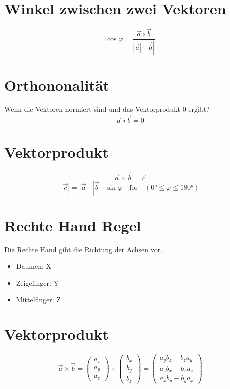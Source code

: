 \section{Winkel zwischen zwei Vektoren}
	\begin{equation}
		\cos\varphi = \frac{\vec{a} \circ \vec{b}}{|\vec{a}| \cdot |\vec{b}|}
	\end{equation}	


\section{Orthononalität}
	Wenn die Vektoren normiert sind und das Vektorprodukt 0 ergibt?		
		\begin{equation}
			\vec{a} \circ \vec{b} = 0
		\end{equation}

\section{Vektorprodukt}
	\begin{equation}
		\vec{a} \times \vec{b} = \vec{c}
	\end{equation}
	\begin{equation}
		|\vec{c}| = |\vec{a}| \cdot |\vec{b}| \cdot \sin\varphi 
		\quad \textrm{for} \quad 
		(\ang{0} \leq \varphi \leq \ang{180})
	\end{equation}


\section{Rechte Hand Regel}
	Die Rechte Hand gibt die Richtung der Achsen vor.
	\begin{itemize}
		\item Daumen: X
		\item Zeigefinger: Y
		\item Mittelfinger: Z
	\end{itemize}


\section{Vektorprodukt}

	\begin{equation}
		\vec{a} \times \vec{b} = 
		\left(
		\begin{array}{c}
			a_{x} \\
			a_{y} \\
			a_{z}
		\end{array}
		\right)
		\times
		\left(
		\begin{array}{c}
			b_{x} \\
			b_{y} \\
			b_{z}				
		\end{array}
		\right)
		= 
		\left(
		\begin{array}{c}
			a_{y}b_{z} - b_{z}a_{y} \\
			a_{z}b_{x} - b_{x}a_{z} \\
			a_{x}b_{y} - b_{y}a_{x}  
		\end{array}
		\right)				
	\end{equation}


